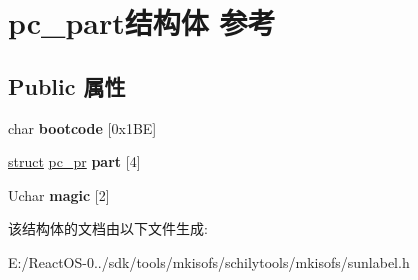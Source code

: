 \hypertarget{structpc__part}{}\section{pc\+\_\+part结构体 参考}
\label{structpc__part}
\subsection*{Public 属性}
\begin{DoxyCompactItemize}
\item 
\mbox{\label{structpc__part_a333948223d592a825ee88daef1153e74}} 
char {\bfseries bootcode} \mbox{[}0x1\+B\+E\mbox{]}
\item 
\mbox{\label{structpc__part_a1469ae1656a6e6561b0a0a47800494cf}} 
\hyperlink{interfacestruct}{struct} \hyperlink{structpc__pr}{pc\+\_\+pr} {\bfseries part} \mbox{[}4\mbox{]}
\item 
\mbox{\label{structpc__part_aa243a1af0f09d7ae31e43677d024c5fe}} 
Uchar {\bfseries magic} \mbox{[}2\mbox{]}
\end{DoxyCompactItemize}


该结构体的文档由以下文件生成\+:\begin{DoxyCompactItemize}
\item 
E\+:/\+React\+O\+S-\/0../sdk/tools/mkisofs/schilytools/mkisofs/sunlabel.\+h\end{DoxyCompactItemize}
